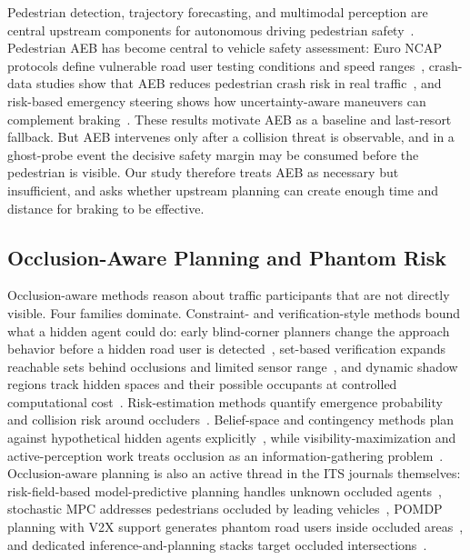 \documentclass[journal]{IEEEtran}
\begin{document}
Pedestrian detection, trajectory forecasting, and multimodal perception are central upstream components for autonomous driving pedestrian safety~\cite{rasouli2020survey}. Pedestrian AEB has become central to vehicle safety assessment: Euro NCAP protocols define vulnerable road user testing conditions and speed ranges~\cite{euroncap2024}, crash-data studies show that AEB reduces pedestrian crash risk in real traffic~\cite{cicchino2022effects}, and risk-based emergency steering shows how uncertainty-aware maneuvers can complement braking~\cite{tolksdorf2026steering}. These results motivate AEB as a baseline and last-resort fallback. But AEB intervenes only after a collision threat is observable, and in a ghost-probe event the decisive safety margin may be consumed before the pedestrian is visible. Our study therefore treats AEB as necessary but insufficient, and asks whether upstream planning can create enough time and distance for braking to be effective.

\subsection{Occlusion-Aware Planning and Phantom Risk}

Occlusion-aware methods reason about traffic participants that are not directly visible. Four families dominate. Constraint- and verification-style methods bound what a hidden agent could do: early blind-corner planners change the approach behavior before a hidden road user is detected~\cite{hoermann2017blindcorners}, set-based verification expands reachable sets behind occlusions and limited sensor range~\cite{orzechowski2018tackling,koschi2021setbased}, and dynamic shadow regions track hidden spaces and their possible occupants at controlled computational cost~\cite{nager2019shadows,occtrack2025}. Risk-estimation methods quantify emergence probability and collision risk around occluders~\cite{schratter2019occlusion,koc2021pedestrian,chen2023quantified,park2023reachability,blindspot2024,trauth2023toward}. Belief-space and contingency methods plan against hypothetical hidden agents explicitly~\cite{zhang2021pomdp,chen2025deadlock,zheng2026occlusioncontingency}, while visibility-maximization and active-perception work treats occlusion as an information-gathering problem~\cite{narksri2022visibility,zhang2021active}. Occlusion-aware planning is also an active thread in the ITS journals themselves: risk-field-based model-predictive planning handles unknown occluded agents~\cite{vanderploeg2024riskfields}, stochastic MPC addresses pedestrians occluded by leading vehicles~\cite{li2024smpc}, POMDP planning with V2X support generates phantom road users inside occluded areas~\cite{zhang2024v2xocclusion}, and dedicated inference-and-planning stacks target occluded intersections~\cite{zhao2024occludedintersections}.
\end{document}
